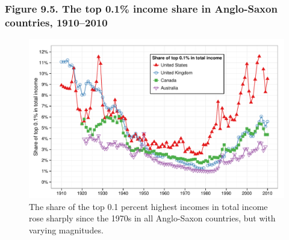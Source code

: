 \documentclass[t]{beamer}\usepackage[]{graphicx}\usepackage[]{color}
\newenvironment{knitrout}{}{} %
\begin{document}
\begin{frame}[label=Figure_9_5]
\frametitle{Figure 9.5. The top 0.1\% income share in Anglo-Saxon countries, 1910--2010}
\begin{figure}[t]
\begin{minipage}[b]{\textwidth}
\centering
\begin{knitrout}\footnotesize
{}\color{fgcolor}

{\centering \includegraphics[width=1\linewidth]{figures/color/Figure_9_5} 

}



\end{knitrout}
\caption{The share of the top 0.1 percent highest incomes in total income rose sharply since the 1970s in all Anglo-Saxon countries, but with varying magnitudes.}
\end{minipage}
\end{figure}
\end{frame}
\end{document}
